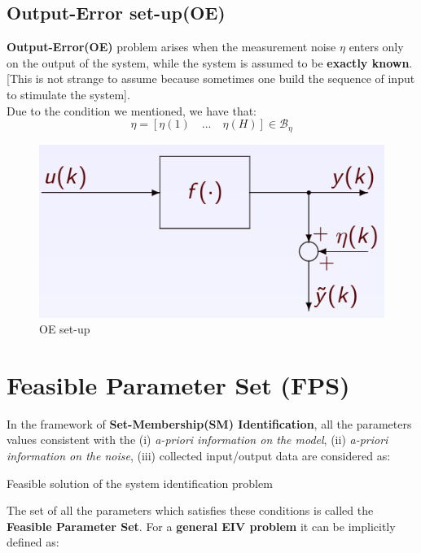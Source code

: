 \subsection{Output-Error set-up(OE)}
\textbf{Output-Error(OE)} problem arises when the measurement noise $\eta$ enters only on the output of the system, while the system is assumed to be \textbf{exactly known}. [This is not strange to assume because sometimes one build the sequence of input to stimulate the system]. \\
Due to the condition we mentioned, we have that:
{\large{
    \begin{equation*}
        \eta = [\eta(1) \quad ... \quad \eta(H)]\in\mathcal{B}_\eta
    \end{equation*}
}}
\begin{figure}[h]
    \centering
    \includegraphics[scale=1]{images/OE.png}
    \caption{OE set-up}
\end{figure}

\section{Feasible Parameter Set (FPS)}
In the framework of \textbf{Set-Membership(SM) Identification}, all the parameters values consistent with the (i) \textit{a-priori information on the model}, (ii) \textit{a-priori information on the noise}, (iii) collected input/output data are considered as:
\begin{center}
    \large
    Feasible solution of the system identification problem
\end{center}
The set of all the parameters which satisfies these conditions is called the \textbf{Feasible Parameter Set}. For a \textbf{general EIV problem} it can be implicitly defined as:\\

